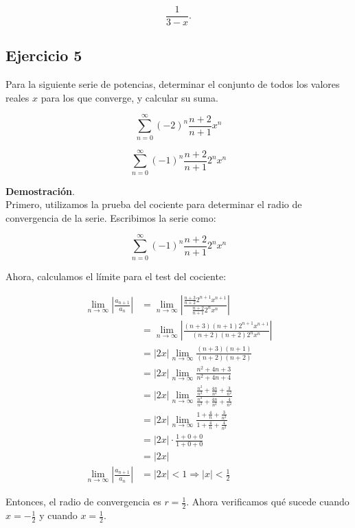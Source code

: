 \documentclass{article}
\begin{document}
    $$
    \frac{1}{3-x}.
    $$

    \subsection*{Ejercicio 5}

    Para la siguiente serie de potencias, determinar el conjunto de todos los valores reales $x$ para los que converge, y calcular su suma.

    $$
    \sum_{n=0}^{\infty}(-2)^{n} \frac{n+2}{n+1} x^{n}
    $$

    $$
    \sum_{n=0}^{\infty}(-1)^{n} \frac{n+2}{n+1} 2^{n} x^{n}
    $$

    \textbf{Demostración}.\\

    Primero, utilizamos la prueba del cociente para determinar el radio de convergencia de la serie. Escribimos la serie como:

    $$
    \sum_{n=0}^{\infty}(-1)^{n} \frac{n+2}{n+1} 2^{n} x^{n}
    $$

    Ahora, calculamos el límite para el test del cociente:

    \begin{align*}
    \lim _{n \rightarrow \infty}\left|\frac{a_{n+1}}{a_{n}}\right| &= \lim _{n \rightarrow \infty}\left|\frac{\frac{n+3}{n+2} 2^{n+1} x^{n+1}}{\frac{n+2}{n+1} 2^{n} x^{n}}\right| \\
    &= \lim _{n \rightarrow \infty}\left|\frac{(n+3)(n+1) 2^{n+1} x^{n+1}}{(n+2)(n+2) 2^{n} x^{n}}\right| \\
    &= |2 x| \lim _{n \rightarrow \infty} \frac{(n+3)(n+1)}{(n+2)(n+2)} \\
    &= |2 x| \lim _{n \rightarrow \infty} \frac{n^{2}+4 n+3}{n^{2}+4 n+4} \\
    &= |2 x| \lim _{n \rightarrow \infty} \frac{\frac{n^{2}}{n^{2}}+\frac{4 n}{n^{2}}+\frac{3}{n^{2}}}{\frac{n^{2}}{n^{2}}+\frac{4 n}{n^{2}}+\frac{4}{n^{2}}} \\
    &= |2 x| \lim _{n \rightarrow \infty} \frac{1+\frac{4}{n}+\frac{3}{n^{2}}}{1+\frac{4}{n}+\frac{4}{n^{2}}} \\
    &= |2 x| \cdot \frac{1+0+0}{1+0+0} \\
    &= |2 x| \\
    \lim _{n \rightarrow \infty}\left|\frac{a_{n+1}}{a_{n}}\right| &= |2 x|<1 \Rightarrow |x|<\frac{1}{2}
    \end{align*}

    Entonces, el radio de convergencia es $r=\frac{1}{2}$. Ahora verificamos qué sucede cuando $x=-\frac{1}{2}$ y cuando $x=\frac{1}{2}$.
\end{document}
